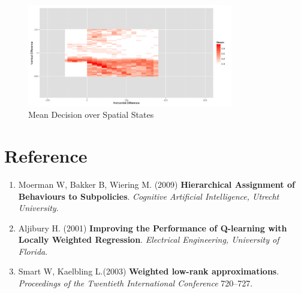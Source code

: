 \documentclass[11pt]{article}
\theoremstyle{definition}
\begin{document}
\begin{figure}[h!]
  \centering
      \includegraphics[width=0.8\textwidth]{"./plots/meanDecision"}
  \caption{Mean Decision over Spatial States}
  \label{fig:meandecision}
\end{figure}



\newpage
\section*{\textbf{Reference}}
\begin{enumerate}
\item \label{ref:handbook}
Moerman W, Bakker B, Wiering M. (2009) \textbf{Hierarchical Assignment of Behaviours to Subpolicies}. \textit{Cognitive Artificial Intelligence, Utrecht University}. 
\item \label{ref:MFieee}
Aljibury H. (2001) \textbf{Improving the Performance of Q-learning with Locally Weighted Regression}. \textit{Electrical Engineering, University of Florida}. 
\item \label{ref:WLA}
Smart W,  Kaelbling L.(2003) \textbf{Weighted low-rank approximations}. \textit{Proceedings of the Twentieth International Conference} 720–727.
\end{enumerate}
\end{document}
